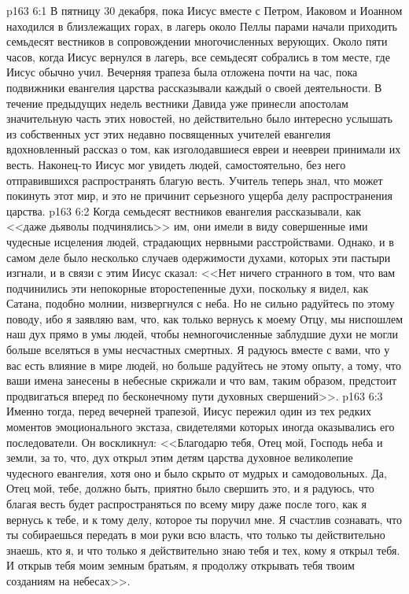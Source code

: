 \vs p163 6:1 В пятницу 30 декабря, пока Иисус вместе с Петром, Иаковом и Иоанном находился в близлежащих горах, в лагерь около Пеллы парами начали приходить семьдесят вестников в сопровождении многочисленных верующих. Около пяти часов, когда Иисус вернулся в лагерь, все семьдесят собрались в том месте, где Иисус обычно учил. Вечерняя трапеза была отложена почти на час, пока подвижники евангелия царства рассказывали каждый о своей деятельности. В течение предыдущих недель вестники Давида уже принесли апостолам значительную часть этих новостей, но действительно было интересно услышать из собственных уст этих недавно посвященных учителей евангелия вдохновленный рассказ о том, как изголодавшиеся евреи и неевреи принимали их весть. Наконец\hyp{}то Иисус мог увидеть людей, самостоятельно, без него отправившихся распространять благую весть. Учитель теперь знал, что может покинуть этот мир, и это не причинит серьезного ущерба делу распространения царства.
\vs p163 6:2 Когда семьдесят вестников евангелия рассказывали, как <<даже дьяволы подчинялись>> им, они имели в виду совершенные ими чудесные исцеления людей, страдающих нервными расстройствами. Однако, и в самом деле было несколько случаев одержимости духами, которых эти пастыри изгнали, и в связи с этим Иисус сказал: <<Нет ничего странного в том, что вам подчинились эти непокорные второстепенные духи, поскольку я видел, как Сатана, подобно молнии, низвергнулся с неба. Но не сильно радуйтесь по этому поводу, ибо я заявляю вам, что, как только вернусь к моему Отцу, мы ниспошлем наш дух прямо в умы людей, чтобы немногочисленные заблудшие духи не могли больше вселяться в умы несчастных смертных. Я радуюсь вместе с вами, что у вас есть влияние в мире людей, но больше радуйтесь не этому опыту, а тому, что ваши имена занесены в небесные скрижали и что вам, таким образом, предстоит продвигаться вперед по бесконечному пути духовных свершений>>.
\vs p163 6:3 Именно тогда, перед вечерней трапезой, Иисус пережил один из тех редких моментов эмоционального экстаза, свидетелями которых иногда оказывались его последователи. Он воскликнул: <<Благодарю тебя, Отец мой, Господь неба и земли, за то, что, дух открыл этим детям царства духовное великолепие чудесного евангелия, хотя оно и было скрыто от мудрых и самодовольных. Да, Отец мой, тебе, должно быть, приятно было свершить это, и я радуюсь, что благая весть будет распространяться по всему миру даже после того, как я вернусь к тебе, и к тому делу, которое ты поручил мне. Я счастлив сознавать, что ты собираешься передать в мои руки всю власть, что только ты действительно знаешь, кто я, и что только я действительно знаю тебя и тех, кому я открыл тебя. И открыв тебя моим земным братьям, я продолжу открывать тебя твоим созданиям на небесах>>.
